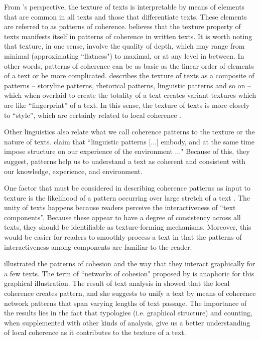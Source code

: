 From 's perspective, the texture of texts is interpretable by means of elements that are common in all texts and those that differentiate texts. 
These elements are referred to as patterns of coherence. 
 believes that the texture property of texts manifests itself in patterns of coherence in written texts. 
It is worth noting that texture, in one sense, involve the quality of depth, which may range from minimal (approximating ``flatness") to maximal, or at any level in between. 
In other words, patterns of coherence can be as basic as the linear order of elements of a text or be more complicated. 
 describes the texture of texts as a composite of patterns -- storyline patterns, rhetorical patterns, linguistic patterns and so on -- which when overlaid to create the totality of a text creates variant textures which are like ``fingerprint'' of a text. 
In this sense, the texture of texts is more closely to ``style'', which are certainly related \cite{sedelow66,stoddard91} to local coherence \cite{barzilay08}. 

Other linguistics also relate what we call coherence patterns to the texture or the nature of texts. 
 claim that ``linguistic patterns  [...] embody, and at the same time impose structure on our experience of the environment ..."
Because of this, they suggest, patterns help us to understand a text as coherent and consistent with our knowledge, experience, and environment. 

One factor that must be considered in describing coherence patterns as input to texture is the likelihood of a pattern occurring over large stretch of a text  . 
The unity of texts happens because readers perceive the interactiveness of ``text components''. 
Because these appear to have a degree of consistency across all texts, they should be identifiable as texture-forming mechanisms.
Moreover, this would be easier for readers to smoothly process a text in that the patterns of interactiveness among components are familiar to the reader.  

 illustrated the patterns of cohesion and the way that they interact graphically for a few texts. 
The term of ``networks of cohesion" proposed by  is anaphoric for this graphical illustration. 
The result of text analysis in  showed that the local coherence creates pattern, and she suggests to unify a text by means of coherence network patterns that span varying lengths of text passage. 
The importance of the results lies in the fact that typologies (i.e. graphical structure) and counting, when supplemented with other kinds of analysis, give us a better understanding of local coherence as it contributes to the texture of a text. 

